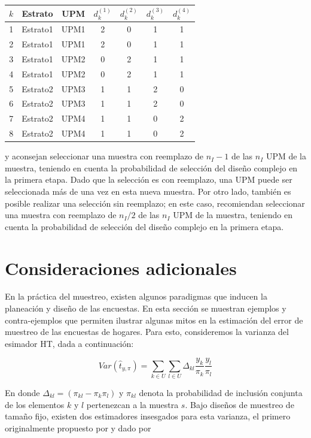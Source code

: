 \documentclass[
  12pt,
  spanish,
]{book}
\begin{document}
\begin{longtable}[]{@{}ccccccc@{}}
\toprule
\(k\) & Estrato & UPM & \(d_k^{(1)}\) & \(d_k^{(2)}\) & \(d_k^{(3)}\) & \(d_k^{(4)}\) \\
\midrule
\endhead
1 & Estrato1 & UPM1 & 2 & 0 & 1 & 1 \\
2 & Estrato1 & UPM1 & 2 & 0 & 1 & 1 \\
3 & Estrato1 & UPM2 & 0 & 2 & 1 & 1 \\
4 & Estrato1 & UPM2 & 0 & 2 & 1 & 1 \\
5 & Estrato2 & UPM3 & 1 & 1 & 2 & 0 \\
6 & Estrato2 & UPM3 & 1 & 1 & 2 & 0 \\
7 & Estrato2 & UPM4 & 1 & 1 & 0 & 2 \\
8 & Estrato2 & UPM4 & 1 & 1 & 0 & 2 \\
\bottomrule
\end{longtable}

\citet{Rao_Wu_1984} y \citet{Rao_Wu_1988} aconsejan seleccionar una muestra con reemplazo de \(n_I - 1\) de las \(n_I\) UPM de la muestra, teniendo en cuenta la probabilidad de selección del diseño complejo en la primera etapa. Dado que la selección es con reemplazo, una UPM puede ser seleccionada más de una vez en esta nueva muestra. Por otro lado, también es posible realizar una selección sin reemplazo; en este caso, \citet{Preston_2009} recomiendan seleccionar una muestra con reemplazo de \(n_I/2\) de las \(n_I\) UPM de la muestra, teniendo en cuenta la probabilidad de selección del diseño complejo en la primera etapa.

\hypertarget{consideraciones-adicionales}{%
\section{Consideraciones adicionales}\label{consideraciones-adicionales}}

En la práctica del muestreo, existen algunos paradigmas que inducen la planeación y diseño de las encuestas. En esta sección se muestran ejemplos y contra-ejemplos que permiten ilustrar algunas mitos en la estimación del error de muestreo de las encuestas de hogares. Para esto, consideremos la varianza del esimador HT, dada a continuación:

\[
Var(\hat{t}_{y, \pi})=
\sum_{k\in U}\sum_{l\in U} \Delta_{kl}\frac{y_k}{\pi_k}\frac{y_l}{\pi_l}
\]

En donde \(\Delta_{kl} = (\pi_{kl}-\pi_k\pi_l)\) y \(\pi_{kl}\) denota la probabilidad de inclusión conjunta de los elementos \(k\) y \(l\) pertenezcan a la muestra \(s\). Bajo diseños de muestreo de tamaño fijo, existen dos estimadores insesgados para esta varianza, el primero originalmente propuesto por \citet{HT} y dado por
\end{document}
